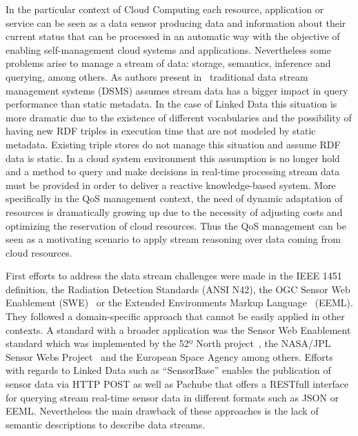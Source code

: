 In the particular context of Cloud Computing each resource, application or 
service can be seen as a data sensor producing data and information about their 
current status that can be processed in an automatic way with the objective of 
enabling self-management cloud systems and applications. Nevertheless some 
problems arise to manage a stream of data: storage, semantics, inference and 
querying, among others. As authors present in~\cite{deri2010} traditional data stream 
management systems (DSMS) assumes stream data has a bigger impact in query 
performance than static metadata. In the case of Linked Data this situation is 
more dramatic due to the existence of different vocabularies and the possibility 
of having new RDF triples in execution time that are not modeled by static 
metadata. Existing triple stores do not manage this situation and assume RDF 
data is static. In a cloud system environment this assumption is no longer hold 
and a method to query and make decisions in real-time processing stream data 
must be provided in order to deliver a reactive knowledge-based system. More 
specifically in the QoS management context, the need of dynamic adaptation of 
resources is dramatically growing up due to the necessity of adjusting costs and 
optimizing the reservation of cloud resources. Thus the QoS management can be 
seen as a motivating scenario to apply stream reasoning over data coming from 
cloud resources.

First efforts to address the data stream challenges were made in the IEEE 1451 
definition, the Radiation Detection Standards (ANSI N42), the OGC Sensor Web 
Enablement (SWE)~\cite{sensorweb-wb} or the Extended Environments Markup Language~\cite{eeml} (EEML). 
They followed a domain-specific approach that cannot be easily applied in other 
contexts. A standard with a broader application was the Sensor Web Enablement 
standard which was implemented by the 52º North project~\cite{52project}, the NASA/JPL~\cite{nasajpl}
Sensor Webs Project~\cite{Sheth:2008:SSW:1444383.1444435} and the European Space Agency among others. 
Efforts with regards to Linked Data such as ``SensorBase'' enables the publication 
of sensor data via HTTP POST as well as Pachube that offers a RESTfull interface 
for querying stream real-time sensor data in different formats such as JSON or EEML. 
Nevertheless the main drawback of these approaches is the lack of semantic descriptions to describe data streams.


